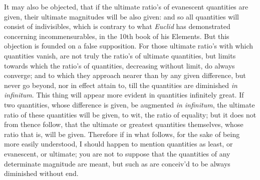 It may also be objected, that if the ultimate ratio's of
evanescent quantities are given, their ultimate magnitudes will
be also given: and so all quantities will consist of
indivisibles, which is contrary to what {\it Euclid\/} has
demonstrated concerning incommensurables, in the 10th book of his
Elements.  But this objection is founded on a false supposition.
For those ultimate ratio's with which quantities vanish, are not
truly the ratio's of ultimate quantities, but limits towards
which the ratio's of quantities, decreasing without limit, do
always converge; and to which they approach nearer than by any
given difference, but never go beyond, nor in effect attain to,
till the quantities are diminished {\it in infinitum}.  This
thing will appear more evident in quantities infinitely great.
If two quantities, whose difference is given, be augmented
{\it in infinitum}, the ultimate ratio of these quantities will
be given, to wit, the ratio of equality; but it does not from
thence follow, that the ultimate or greatest quantities
themselves, whose ratio that is, will be given.  Therefore if in
what follows, for the sake of being more easily understood, I
should happen to mention quantities as least, or evanescent, or
ultimate; you are not to suppose that the quantities of any
determinate magnitude are meant, but such as are conceiv'd to be
always diminished without end.

\bye


